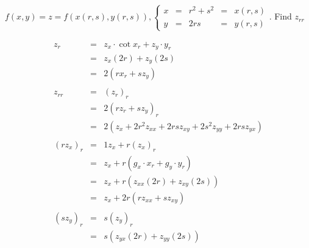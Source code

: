 \begin{eg}
\(f(x, y) = z = f(x(r, s), y(r, s)), \left\{ \begin{array}{rcccl}
x & = & r^2 + s^2 & = & x(r, s)\\
y & = & 2rs & = & y(r, s)
\end{array}\right.\). Find \(z_{rr}\)

\soln
\[\begin{array}{rcl}
z_r & = & z_x \cdot \cot x_r + z_y \cdot y_r\\
& = & z_x (2r) + z_y(2s)\\
& = & 2(rx_r + sz_y)\\\\
z_{rr} & = & (z_r)_r\\
& = & 2(rz_r + sz_y)_r\\
& = & 2(z_x + 2r^2z_{xx} + 2rs z_{xy} + 2s^2 z_{yy} + 2rs z_{yx})\\\\
(rz_x)_r & = & 1 z_x + r (z_x)_r\\
& = & z_x + r(g_x \cdot x_r + g_y \cdot y_r)\\
& = & z_x + r(z_{xx} (2r) + z_{xy} (2s))\\
& = & z_x + 2r(r z_{xx} + s z_{xy})\\\\
(sz_y)_r & = & s(z_y)_r\\
& = & s(z_{yx} (2r) + z_{yy}(2s))
\end{array}\]
\end{eg}
